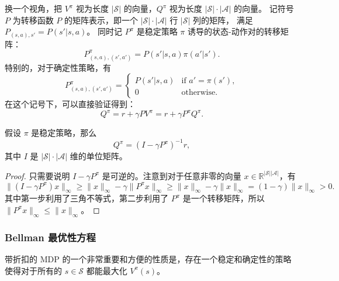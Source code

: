 \documentclass[fontset=none,zihao=-4]{Notes}
\begin{document}
换一个视角，把 $V^\pi$ 视为长度 $|\mathcal S|$ 的向量，$Q^\pi$ 视为长度 $|\mathcal S|\cdot |\mathcal A|$ 的向量。
记符号 $P$ 为转移函数 $P$ 的矩阵表示，即一个 $|\mathcal S|\cdot |\mathcal A|$ 行 $|\mathcal S|$ 列的矩阵，
满足 $P_{(s,a),s'}=P(s'|s,a)$。
同时记 $P^\pi$ 是稳定策略 $\pi$ 诱导的状态-动作对的转移矩阵：
\[
  P^\pi_{(s,a),(s',a')} = P(s'|s,a)\pi(a'|s').
\]
特别的，对于确定性策略，有
\[
  P^\pi_{(s,a),(s',a')} = \begin{cases}
    P(s'|s,a) & \text{if $a'=\pi(s')$},\\
    0 & \text{otherwise}.
  \end{cases}
\]
在这个记号下，可以直接验证得到：
\[
  Q^\pi=r+\gamma PV^\pi=r+\gamma P^\pi Q^\pi.
\]

\begin{corollary}
  假设 $\pi$ 是稳定策略，那么 
  \begin{equation}
    Q^\pi=(I-\gamma P^\pi)^{-1}r,
  \end{equation}
  其中 $I$ 是 $|\mathcal S|\cdot |\mathcal A|$ 维的单位矩阵。
\end{corollary}
\begin{proof}
  只需要说明 $I-\gamma P^\pi$ 是可逆的。注意到对于任意非零的向量 $x\in \mathbb{R}^{|\mathcal S| |\mathcal A|}$，有
  \begin{equation*}
    \| (I-\gamma P^\pi)x\|_\infty \geq \|x\|_\infty - \gamma \|P^\pi x\|_\infty\geq 
    \|x\|_\infty - \gamma \|x\|_\infty = (1-\gamma)\|x\|_\infty >0.
  \end{equation*}
  其中第一步利用了三角不等式，第二步利用了 $P^\pi$ 是一个转移矩阵，所以 $\|P^\pi x\|_\infty \leq \|x\|_\infty$。
\end{proof}

\subsubsection{Bellman 最优性方程}

带折扣的 MDP 的一个非常重要和方便的性质是，存在一个稳定和确定性的策略使得对于所有的 $s \in \mathcal S$
都能最大化 $V^\pi(s)$。
\end{document}
